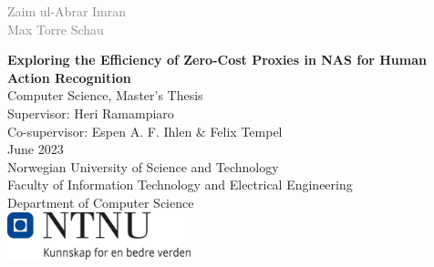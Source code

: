 \begin{titlepage}
        \vspace*{0.3cm}
        \noindent
        \textcolor{gray}{\Large Zaim ul-Abrar Imran}\\[0.2cm]
        \textcolor{gray}{\Large Max Torre Schau}\\
        
        \vspace{0.6cm}

        
        {\noindent \LARGE \bfseries Exploring the Efficiency of Zero-Cost Proxies in NAS for Human Action Recognition }\\


        \vspace{6.0cm}
        \noindent
        Computer Science, Master's Thesis \\
        Supervisor: Heri Ramampiaro\\
        Co-supervisor: Espen A. F. Ihlen \& Felix Tempel\\     
        June 2023\\

        \vspace{0.8cm} 
        \noindent
        Norwegian University of Science and Technology\\
        Faculty of Information Technology and Electrical Engineering\\
        Department of Computer Science\\
       
        \vspace{0.8cm}
        \noindent
        \includegraphics[width=0.40\textwidth]{figures/NTNU_logo.png}
\end{titlepage}

